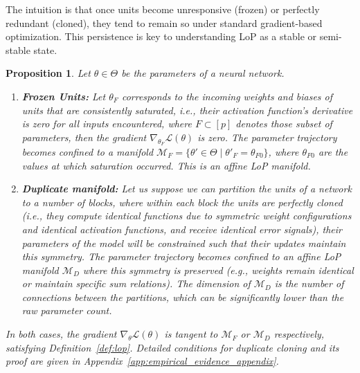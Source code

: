 \documentclass{article}
\newcommand{\Loss}{\mathcal{L}}
\newcommand{\GIU}[1]{\todo[color=purple!30,size=\tiny]{GIU: #1}}
\newtheorem{proposition}{Proposition}[section]
\newtheorem{remark}{Remark}[section]
\numberwithin{figure}{section}
\begin{document}
The intuition is that once units become unresponsive (frozen) or perfectly redundant (cloned), they tend to remain so under standard gradient-based optimization. This persistence is key to understanding LoP as a stable or semi-stable state.
\begin{proposition}
\label{prop:frozen_duplicate_lop}
Let $\theta \in \Theta$ be the parameters of a neural network.
\begin{enumerate}
    \item \textbf{Frozen Units:} Let $\theta_F$ corresponds to the incoming weights and biases of units that are consistently saturated, i.e., their activation function's derivative is zero for all inputs encountered, where $F \subset [p]$ denotes those subset of parameters, then the gradient $\nabla_{\theta_F} \Loss(\theta)$ is zero. The parameter trajectory becomes confined to a manifold $\mathcal{M}_F = \{ \theta' \in \Theta \mid \theta'_F = \theta_{F0} \}$, where $\theta_{F0}$ are the values at which saturation occurred. This is an affine LoP manifold.

    \item \textbf{Duplicate manifold:} Let us suppose we can partition the units of a network to a number of blocks, where within each block the units are perfectly cloned (i.e., they compute identical functions due to symmetric weight configurations and identical activation functions, and receive identical error signals), their  parameters of the model will be constrained such that their updates maintain this symmetry. The parameter trajectory becomes confined to an affine LoP manifold $\mathcal{M}_D$ where this symmetry is preserved (e.g., weights remain identical or maintain specific sum relations). The dimension of $\mathcal{M}_D$ is the number of connections between the partitions, which can be significantly lower than the raw parameter count.
\end{enumerate}
In both cases, the gradient $\nabla_\theta \Loss(\theta)$ is tangent to $\mathcal{M}_F$ or $\mathcal{M}_D$ respectively, satisfying Definition~\ref{def:lop}.
Detailed conditions for duplicate cloning and its proof are given in  Appendix~\ref{app:empirical_evidence_appendix}. 
\end{proposition}

\end{document}
